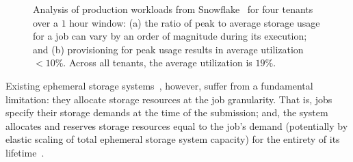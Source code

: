 \begin{figure}[t]
  \centering
  \vspace{-1em}
  \caption{\small{Analysis of production workloads from Snowflake~\cite{snowset} for four tenants over a $1$ hour window: (a) the ratio of peak to average storage usage for a job can vary by an order of magnitude during its execution; and (b) provisioning for peak usage results in average utilization $<10\%$. Across all tenants, the average utilization is $19\%$.}}\label{fig:ephemerals}\vspace{-1.25em}
\end{figure}

Existing ephemeral storage systems~\cite{locus, pocket}, however, suffer from a fundamental limitation: they allocate storage resources at the job granularity. That is, jobs specify their storage demands at the time of the submission; and, the system allocates and reserves storage resources equal to the job's demand (potentially by elastic scaling of total ephemeral storage system capacity) for the entirety of its lifetime~\cite[Figure 1]{pocket}. 

